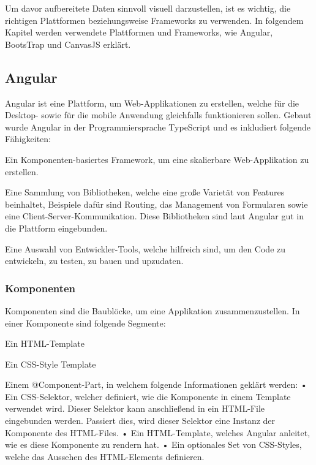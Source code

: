 Um davor aufbereitete Daten sinnvoll visuell darzustellen, ist es wichtig, die richtigen Plattformen beziehungsweise Frameworks zu verwenden. In folgendem Kapitel werden verwendete Plattformen und Frameworks, wie Angular, BootsTrap und CanvasJS erklärt. 
\subsection{Angular}
 
Angular ist eine Plattform, um Web-Applikationen zu erstellen, welche für die Desktop- sowie für die mobile Anwendung gleichfalls funktionieren sollen. Gebaut wurde Angular in der Programmiersprache TypeScript und es inkludiert folgende Fähigkeiten:
 
\begin{compactitem}
    \item Ein Komponenten-basiertes Framework, um eine skalierbare Web-Applikation zu erstellen.
    \item Eine Sammlung von Bibliotheken, welche eine große Varietät von Features beinhaltet, Beispiele dafür sind Routing, das Management von Formularen sowie eine Client-Server-Kommunikation. Diese Bibliotheken sind laut Angular gut in die Plattform eingebunden.
    \item Eine Auswahl von Entwickler-Tools, welche hilfreich sind, um den Code zu entwickeln, zu testen, zu bauen und upzudaten.
\end{compactitem}
 
\subsubsection{Komponenten}
Komponenten sind die Baublöcke, um eine Applikation zusammenzustellen. In einer Komponente sind folgende Segmente:
 
\begin{compactitem}
    \item Ein HTML-Template
    \item Ein CSS-Style Template
    \item Einem @Component-Part, in welchem folgende Informationen geklärt werden:
    \subitem • Ein CSS-Selektor, welcher definiert, wie die Komponente in einem Template verwendet wird. Dieser Selektor kann anschließend in ein HTML-File eingebunden werden. Passiert dies, wird dieser Selektor eine Instanz der Komponente des HTML-Files.
    \subitem • Ein HTML-Template, welches Angular anleitet, wie es diese Komponente zu rendern hat.
    \subitem • Ein optionales Set von CSS-Styles, welche das Aussehen des HTML-Elements definieren.
\end{compactitem}
\cite{angularOfficialSite}
 
